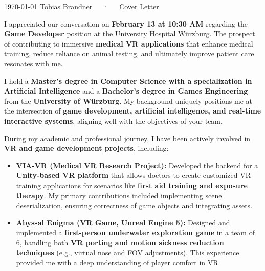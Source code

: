 \documentclass[11pt, a4paper]{awesome-cv}
\begin{document}
\makecvheader[R]

\makecvfooter
  {\today}
  {Tobias Brandner~~~·~~~Cover Letter}
  {}

\makelettertitle

\begin{cvletter}

  I appreciated our conversation on \textbf{February 13 at 10:30 AM} regarding the \textbf{Game Developer} position at the University Hospital 
  Würzburg. The prospect of contributing to immersive \textbf{medical VR applications} that enhance medical training, 
  reduce reliance on animal testing, and ultimately improve patient care resonates with me.

  I hold a \textbf{Master’s degree in Computer Science with a specialization in Artificial Intelligence} and a 
  \textbf{Bachelor’s degree in Games Engineering} from the \textbf{University of Würzburg}. 
  My background uniquely positions me at the intersection of \textbf{game development, artificial intelligence, and real-time interactive systems}, 
  aligning well with the objectives of your team.
  
  During my academic and professional journey, I have been actively involved in \textbf{VR and game development projects}, including:
  
  \begin{itemize}
      \item \textbf{VIA-VR (Medical VR Research Project):} 
      Developed the backend for a \textbf{Unity-based VR platform} that allows doctors to create customized VR training applications 
      for scenarios like \textbf{first aid training and exposure therapy}. 
      My primary contributions included implementing scene deserialization, ensuring correctness of game objects 
      and integrating assets.
      \item \textbf{Abyssal Enigma (VR Game, Unreal Engine 5):} 
      Designed and implemented a \textbf{first-person underwater exploration game} in a team of 6, 
      handling both \textbf{VR porting and motion sickness reduction techniques} (e.g., virtual nose and FOV adjustments). 
      This experience provided me with a deep understanding of player comfort in VR.
  \end{itemize}
  

\end{cvletter}
\end{document}
